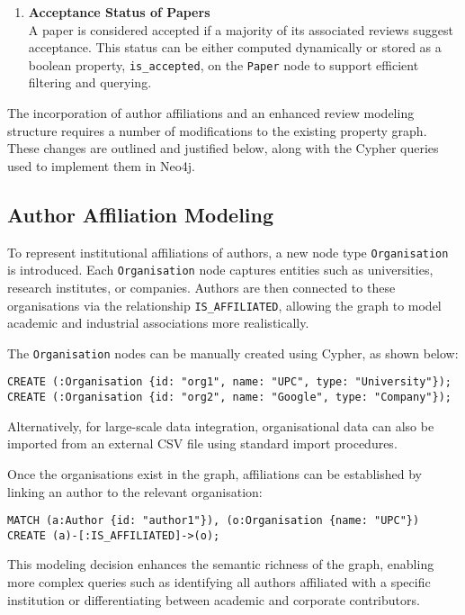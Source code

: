 \documentclass{article}
\begin{document}
\begin{enumerate}
    \item \textbf{Acceptance Status of Papers} \\
    A paper is considered accepted if a majority of its associated reviews suggest acceptance. This status can be either computed dynamically or stored as a boolean property, \texttt{is\_accepted}, on the \texttt{Paper} node to support efficient filtering and querying.
\end{enumerate}

The incorporation of author affiliations and an enhanced review modeling structure requires a number of modifications to the existing property graph. These changes are outlined and justified below, along with the Cypher queries used to implement them in Neo4j.

\subsection*{Author Affiliation Modeling}

To represent institutional affiliations of authors, a new node type \texttt{Organisation} is introduced. Each \texttt{Organisation} node captures entities such as universities, research institutes, or companies. Authors are then connected to these organisations via the relationship \texttt{IS\_AFFILIATED}, allowing the graph to model academic and industrial associations more realistically.

The \texttt{Organisation} nodes can be manually created using Cypher, as shown below:

\begin{verbatim}
CREATE (:Organisation {id: "org1", name: "UPC", type: "University"});
CREATE (:Organisation {id: "org2", name: "Google", type: "Company"});
\end{verbatim}

Alternatively, for large-scale data integration, organisational data can also be imported from an external CSV file using standard import procedures.

Once the organisations exist in the graph, affiliations can be established by linking an author to the relevant organisation:

\begin{verbatim}
MATCH (a:Author {id: "author1"}), (o:Organisation {name: "UPC"})
CREATE (a)-[:IS_AFFILIATED]->(o);
\end{verbatim}

This modeling decision enhances the semantic richness of the graph, enabling more complex queries such as identifying all authors affiliated with a specific institution or differentiating between academic and corporate contributors.
\end{document}
